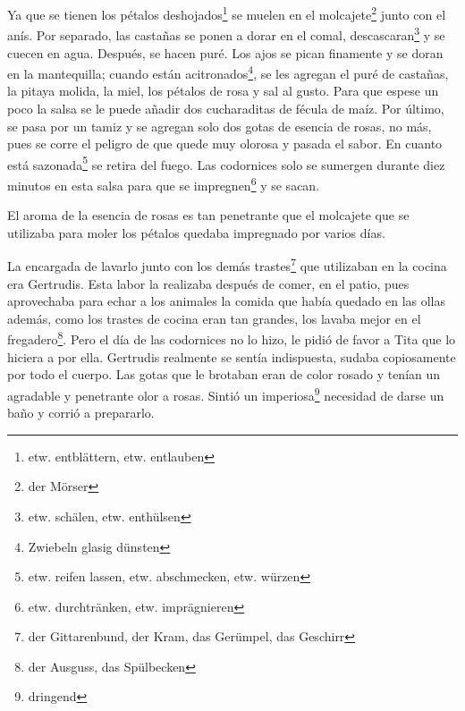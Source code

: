 Ya que se tienen los pétalos deshojados\footnote{etw. entblättern, etw. entlauben}
se muelen en el molcajete\footnote{der Mörser} junto
con el anís. Por separado, las castañas se ponen a dorar en el comal, descascaran\footnote{etw. schälen, etw. enthülsen} y se
cuecen en agua. Después, se hacen puré. Los ajos se
pican finamente y se doran en la mantequilla; cuando están acitronados\footnote{Zwiebeln glasig dünsten},
se les agregan el puré de castañas, la pitaya molida, la miel, los
pétalos de rosa y sal al gusto. Para que espese un poco la salsa se le
puede añadir dos cucharaditas de fécula de maíz. Por último, se pasa por
un tamiz y se agregan solo dos gotas de esencia de rosas, no más, pues se
corre el peligro de que quede muy olorosa y pasada el sabor. En cuanto
está sazonada\footnote{etw. reifen lassen, etw. abschmecken, etw. würzen}
se retira del fuego. Las codornices solo se sumergen
durante diez minutos en esta salsa para que se impregnen\footnote{etw. durchtränken, etw. imprägnieren}
y se sacan.

El aroma de la esencia de rosas es tan penetrante que el molcajete que
se utilizaba para moler los pétalos quedaba impregnado por varios días.

La encargada de lavarlo junto con los demás trastes\footnote{der Gittarenbund, der Kram, das Gerümpel, das Geschirr}
que utilizaban en la cocina era Gertrudis. Esta labor la realizaba después
de comer, en el patio, pues aprovechaba para echar a los animales la comida
que había quedado en las ollas además, como los trastes de cocina eran tan
grandes, los lavaba mejor en el fregadero\footnote{der Ausguss, das Spülbecken}.
Pero el día de las codornices no lo hizo, le pidió de favor a Tita que lo hiciera a por ella.
Gertrudis realmente se sentía indispuesta, sudaba copiosamente por todo
el cuerpo. Las gotas que le brotaban eran de color rosado y tenían un
agradable y penetrante olor a rosas. Sintió un imperiosa\footnote{dringend}
necesidad de darse un baño y corrió a prepararlo.

